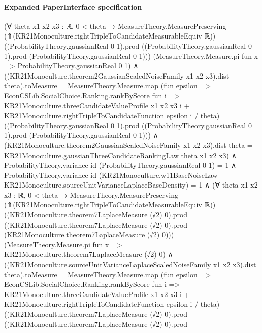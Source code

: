 \documentclass[10pt]{article}
\begin{document}
\paragraph{Expanded PaperInterface specification}
\begin{ReviewVerbatim}
(∀ {theta x1 x2 x3 : ℝ},
    0 < theta →
      MeasureTheory.MeasurePreserving (⇑(KR21Monoculture.rightTripleToCandidateMeasurableEquiv ℝ))
          ((ProbabilityTheory.gaussianReal 0 1).prod
            ((ProbabilityTheory.gaussianReal 0 1).prod (ProbabilityTheory.gaussianReal 0 1)))
          (MeasureTheory.Measure.pi fun x => ProbabilityTheory.gaussianReal 0 1) ∧
        ((KR21Monoculture.theorem2GaussianScaledNoiseFamily x1 x2 x3).dist theta).toMeasure =
            MeasureTheory.Measure.map
              (fun epsilon =>
                EconCSLib.SocialChoice.Ranking.rankByScore fun i =>
                  KR21Monoculture.threeCandidateValueProfile x1 x2 x3 i +
                    KR21Monoculture.rightTripleToCandidateFunction epsilon i / theta)
              ((ProbabilityTheory.gaussianReal 0 1).prod
                ((ProbabilityTheory.gaussianReal 0 1).prod (ProbabilityTheory.gaussianReal 0 1))) ∧
          (KR21Monoculture.theorem2GaussianScaledNoiseFamily x1 x2 x3).dist theta =
            KR21Monoculture.gaussianThreeCandidateRankingLaw theta x1 x2 x3) ∧
  ProbabilityTheory.variance id (ProbabilityTheory.gaussianReal 0 1) = 1 ∧
    ProbabilityTheory.variance id
          (KR21Monoculture.w11BaseNoiseLaw KR21Monoculture.sourceUnitVarianceLaplaceBaseDensity) =
        1 ∧
      (∀ {theta x1 x2 x3 : ℝ},
          0 < theta →
            MeasureTheory.MeasurePreserving (⇑(KR21Monoculture.rightTripleToCandidateMeasurableEquiv ℝ))
                ((KR21Monoculture.theorem7LaplaceMeasure (√2) 0).prod
                  ((KR21Monoculture.theorem7LaplaceMeasure (√2) 0).prod
                    (KR21Monoculture.theorem7LaplaceMeasure (√2) 0)))
                (MeasureTheory.Measure.pi fun x => KR21Monoculture.theorem7LaplaceMeasure (√2) 0) ∧
              ((KR21Monoculture.sourceUnitVarianceLaplaceScaledNoiseFamily x1 x2 x3).dist theta).toMeasure =
                  MeasureTheory.Measure.map
                    (fun epsilon =>
                      EconCSLib.SocialChoice.Ranking.rankByScore fun i =>
                        KR21Monoculture.threeCandidateValueProfile x1 x2 x3 i +
                          KR21Monoculture.rightTripleToCandidateFunction epsilon i / theta)
                    ((KR21Monoculture.theorem7LaplaceMeasure (√2) 0).prod
                      ((KR21Monoculture.theorem7LaplaceMeasure (√2) 0).prod

\end{ReviewVerbatim}
\end{document}
